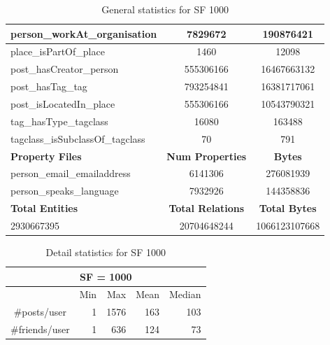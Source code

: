 \begin{table}[H]
\begin{tabular} {| l | c | c |}
\hline
person\_workAt\_organisation & 7829672 & 190876421 \\
\hline
place\_isPartOf\_place & 1460 & 12098 \\
\hline
post\_hasCreator\_person & 555306166 & 16467663132 \\
\hline
post\_hasTag\_tag & 793254841 & 16381717061 \\
\hline
post\_isLocatedIn\_place & 555306166 & 10543790321 \\
\hline
tag\_hasType\_tagclass & 16080 & 163488 \\
\hline
tagclass\_isSubclassOf\_tagclass & 70 & 791 \\
\hline \hline
\textbf{Property Files} & \textbf{Num Properties} & \textbf{Bytes} \\
\hline \hline
person\_email\_emailaddress & 6141306 & 276081939 \\
\hline
person\_speaks\_language & 7932926 & 144358836 \\
\hline \hline
\textbf{Total Entities} & \textbf{Total Relations} & \textbf{Total Bytes} \\
\hline \hline
 2930667395 & 20704648244 & 1066123107668 \\
\hline
\end{tabular}
\caption{ General statistics for SF 1000}
\end{table}

\begin{table}[H]
    \centering
    \begin{tabular}{|c||r|r|r|r|}
\hline    \multicolumn{5}{|c|}{SF = 1000 }  \\
\hline & Min & Max & Mean & Median   \\
\hline  \#posts/user  &1 &  1576 & 163 & 103 \\
\hline  \#friends/user  &1 &  636 & 124 & 73 \\
\hline
\end{tabular}
\caption{Detail statistics for SF 1000}
\end{table}

